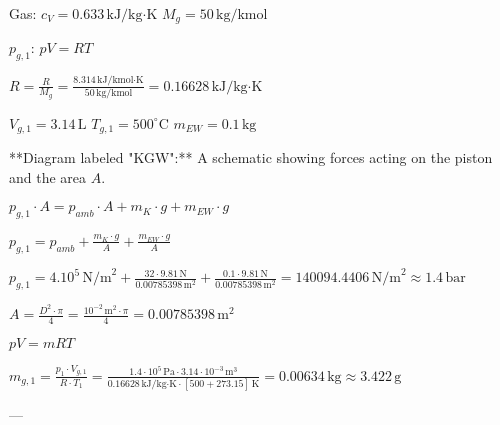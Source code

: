 Gas:  
\( c_V = 0.633 \, \text{kJ/kg·K} \)  
\( M_g = 50 \, \text{kg/kmol} \)  

\( p_{g,1} \): \( pV = RT \)  

\( R = \frac{R}{M_g} = \frac{8.314 \, \text{kJ/kmol·K}}{50 \, \text{kg/kmol}} = 0.16628 \, \text{kJ/kg·K} \)  

\( V_{g,1} = 3.14 \, \text{L} \)  
\( T_{g,1} = 500^\circ \text{C} \)  
\( m_{EW} = 0.1 \, \text{kg} \)  

**Diagram labeled "KGW":**  
A schematic showing forces acting on the piston and the area \( A \).  

\( p_{g,1} \cdot A = p_{amb} \cdot A + m_K \cdot g + m_{EW} \cdot g \)  

\( p_{g,1} = p_{amb} + \frac{m_K \cdot g}{A} + \frac{m_{EW} \cdot g}{A} \)  

\( p_{g,1} = 4.10^5 \, \text{N/m}^2 + \frac{32 \cdot 9.81 \, \text{N}}{0.00785398 \, \text{m}^2} + \frac{0.1 \cdot 9.81 \, \text{N}}{0.00785398 \, \text{m}^2} = 140094.4406 \, \text{N/m}^2 \approx 1.4 \, \text{bar} \)  

\( A = \frac{D^2 \cdot \pi}{4} = \frac{10^{-2} \, \text{m}^2 \cdot \pi}{4} = 0.00785398 \, \text{m}^2 \)  

\( pV = mRT \)  

\( m_{g,1} = \frac{p_1 \cdot V_{g,1}}{R \cdot T_1} = \frac{1.4 \cdot 10^5 \, \text{Pa} \cdot 3.14 \cdot 10^{-3} \, \text{m}^3}{0.16628 \, \text{kJ/kg·K} \cdot [500 + 273.15] \, \text{K}} = 0.00634 \, \text{kg} \approx 3.422 \, \text{g} \)  

---